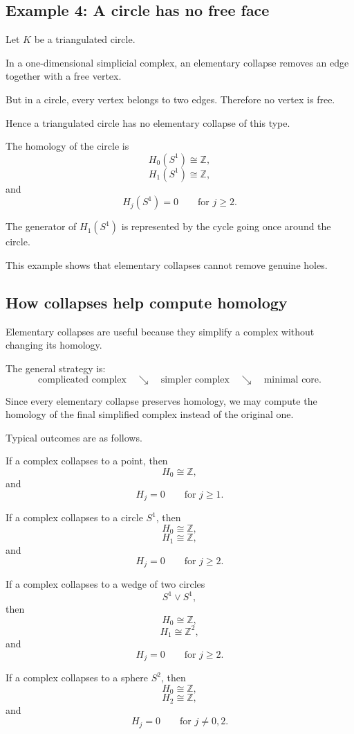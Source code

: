 \documentclass[12pt,a4paper]{article}
\theoremstyle{notespace}
\begin{document}
\subsection{Example 4: A circle has no free face}

Let \(K\) be a triangulated circle.

In a one-dimensional simplicial complex, an elementary collapse removes an edge together with a free vertex.

But in a circle, every vertex belongs to two edges. Therefore no vertex is free.

Hence a triangulated circle has no elementary collapse of this type.

The homology of the circle is
\[
H_0(S^1)\cong \mathbb Z,
\]
\[
H_1(S^1)\cong \mathbb Z,
\]
and
\[
H_j(S^1)=0
\qquad
\text{for } j\geq 2.
\]

The generator of \(H_1(S^1)\) is represented by the cycle going once around the circle.

This example shows that elementary collapses cannot remove genuine holes.

\subsection{How collapses help compute homology}

Elementary collapses are useful because they simplify a complex without changing its homology.

The general strategy is:
\[
\text{complicated complex}
\quad
\searrow
\quad
\text{simpler complex}
\quad
\searrow
\quad
\text{minimal core}.
\]

Since every elementary collapse preserves homology, we may compute the homology of the final simplified complex instead of the original one.

Typical outcomes are as follows.

If a complex collapses to a point, then
\[
H_0\cong \mathbb Z,
\]
and
\[
H_j=0
\qquad
\text{for } j\geq 1.
\]

If a complex collapses to a circle \(S^1\), then
\[
H_0\cong \mathbb Z,
\]
\[
H_1\cong \mathbb Z,
\]
and
\[
H_j=0
\qquad
\text{for } j\geq 2.
\]

If a complex collapses to a wedge of two circles
\[
S^1\vee S^1,
\]
then
\[
H_0\cong \mathbb Z,
\]
\[
H_1\cong \mathbb Z^2,
\]
and
\[
H_j=0
\qquad
\text{for } j\geq 2.
\]

If a complex collapses to a sphere \(S^2\), then
\[
H_0\cong \mathbb Z,
\]
\[
H_2\cong \mathbb Z,
\]
and
\[
H_j=0
\qquad
\text{for } j\neq 0,2.
\]
\end{document}
